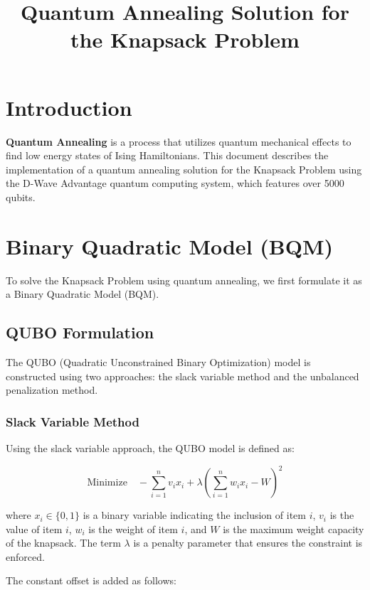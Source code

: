 \documentclass{article}
\begin{document}
\title{Quantum Annealing Solution for the Knapsack Problem}
\author{}
\date{}
\maketitle

\section{Introduction}

\textbf{Quantum Annealing} is a process that utilizes quantum mechanical effects to find low energy states of Ising Hamiltonians. This document describes the implementation of a quantum annealing solution for the Knapsack Problem using the D-Wave Advantage quantum computing system, which features over 5000 qubits.

\section{Binary Quadratic Model (BQM)}

To solve the Knapsack Problem using quantum annealing, we first formulate it as a Binary Quadratic Model (BQM).

\subsection{QUBO Formulation}

The QUBO (Quadratic Unconstrained Binary Optimization) model is constructed using two approaches: the slack variable method and the unbalanced penalization method.

\subsubsection{Slack Variable Method}

Using the slack variable approach, the QUBO model is defined as:

\[
\text{Minimize} \quad -\sum_{i=1}^{n} v_i x_i + \lambda \left( \sum_{i=1}^{n} w_i x_i - W \right)^2
\]

where \( x_i \in \{0, 1\} \) is a binary variable indicating the inclusion of item \( i \), \( v_i \) is the value of item \( i \), \( w_i \) is the weight of item \( i \), and \( W \) is the maximum weight capacity of the knapsack. The term \( \lambda \) is a penalty parameter that ensures the constraint is enforced.

The constant offset is added as follows:
\end{document}
